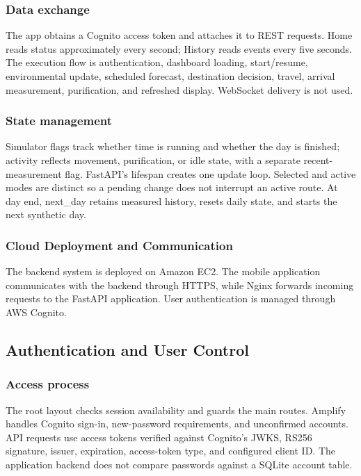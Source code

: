 \documentclass[conference]{IEEEtran}
\begin{document}
\subsubsection{Data exchange}

The app obtains a Cognito access token and attaches it to REST requests. Home reads status approximately every second; History reads events every five seconds. The execution flow is authentication, dashboard loading, start/resume, environmental update, scheduled forecast, destination decision, travel, arrival measurement, purification, and refreshed display. WebSocket delivery is not used.

\subsubsection{State management}

Simulator flags track whether time is running and whether the day is finished; activity reflects movement, purification, or idle state, with a separate recent-measurement flag. FastAPI's lifespan creates one update loop. Selected and active modes are distinct so a pending change does not interrupt an active route. At day end, next\_\allowbreak{}day retains measured history, resets daily state, and starts the next synthetic day.

\subsubsection{Cloud Deployment and Communication}

The backend system is deployed on Amazon EC2. The mobile application communicates with the backend through HTTPS, while Nginx forwards incoming requests to the FastAPI application. User authentication is managed through AWS Cognito. \cite{ref14,ref17}

\subsection{Authentication and User Control}

\subsubsection{Access process}

The root layout checks session availability and guards the main routes. Amplify handles Cognito sign-in, new-password requirements, and unconfirmed accounts. API requests use access tokens verified against Cognito's JWKS, RS256 signature, issuer, expiration, access-token type, and configured client ID. The application backend does not compare passwords against a SQLite account table. \cite{ref15,ref16}
\end{document}
